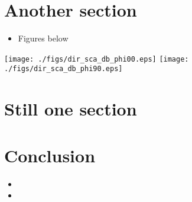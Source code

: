 \documentclass[portrait,a1,final]{a0poster} %
\newcommand{\sectionspace}{10mm} %
\newcommand{\figurespace}{10mm} %
\begin{document}
\begin{minipage}{0.98\linewidth}
\begin{minipage}[t]{0.47\linewidth}
\vspace{\sectionspace}
\section{Another section}


\begin{itemize}
		
	\item Figures below
	
\end{itemize}


\vspace{\figurespace}
\begin{center}
  	\texttt{[image: ./figs/dir\_sca\_db\_phi00.eps]}
  	\texttt{[image: ./figs/dir\_sca\_db\_phi90.eps]}
\end{center}
\vspace{\figurespace}






\end{minipage} %
\hspace{0.03\linewidth} %
\begin{minipage}[t]{0.47\linewidth}
\setlength{\parindent}{10mm} %








\section{Still one section}

\lipsum[3-4]







\vspace{\sectionspace}
\section{Conclusion}

\begin{itemize}
	\item \lipsum[5]
	\item \lipsum[6]
\end{itemize}




\end{minipage}
\end{minipage}
\end{document}
